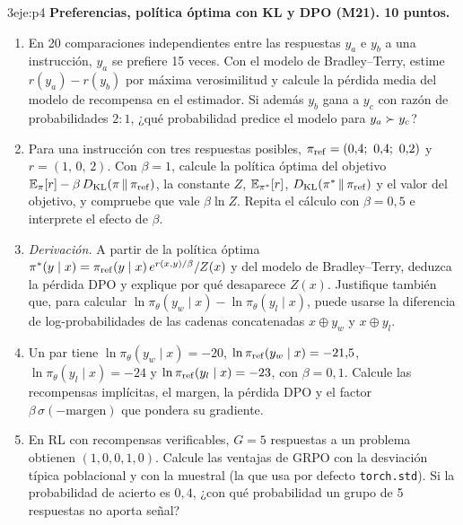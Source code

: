 \begin{ejercicio}{3}{eje:p4}
\textbf{Preferencias, política óptima con KL y DPO (M21). 10 puntos.}
\begin{enumerate}[label=(\alph*)]
  \item {} En 20 comparaciones independientes entre las respuestas $y_a$ e $y_b$ a una instrucción, $y_a$ se prefiere 15 veces. Con el modelo de Bradley--Terry, estime $r(y_a)-r(y_b)$ por máxima verosimilitud y calcule la pérdida media del modelo de recompensa en el estimador. Si además $y_b$ gana a $y_c$ con razón de probabilidades $2{:}1$, ¿qué probabilidad predice el modelo para $y_a\succ y_c$?
  \item {} Para una instrucción con tres respuestas posibles, $\pi_{\mathrm{ref}}=(0{,}4;\ 0{,}4;\ 0{,}2)$ y $r=(1,\,0,\,2)$. Con $\beta=1$, calcule la política óptima del objetivo $\mathbb{E}_\pi[r]-\beta\,D_{\mathrm{KL}}(\pi\,\|\,\pi_{\mathrm{ref}})$, la constante $Z$, $\mathbb{E}_{\pi^{*}}[r]$, $D_{\mathrm{KL}}(\pi^{*}\,\|\,\pi_{\mathrm{ref}})$ y el valor del objetivo, y compruebe que vale $\beta\ln Z$. Repita el cálculo con $\beta=0{,}5$ e interprete el efecto de $\beta$.
  \item {} \emph{Derivación.} A partir de la política óptima $\pi^{*}(y\mid x)=\pi_{\mathrm{ref}}(y\mid x)\,e^{r(x,y)/\beta}/Z(x)$ y del modelo de Bradley--Terry, deduzca la pérdida DPO y explique por qué desaparece $Z(x)$. Justifique también que, para calcular $\ln\pi_\theta(y_w\mid x)-\ln\pi_\theta(y_l\mid x)$, puede usarse la diferencia de log-probabilidades de las cadenas concatenadas $x\oplus y_w$ y $x\oplus y_l$.
  \item {} Un par tiene $\ln\pi_\theta(y_w\mid x)=-20$, $\ln\pi_{\mathrm{ref}}(y_w\mid x)=-21{,}5$, $\ln\pi_\theta(y_l\mid x)=-24$ y $\ln\pi_{\mathrm{ref}}(y_l\mid x)=-23$, con $\beta=0{,}1$. Calcule las recompensas implícitas, el margen, la pérdida DPO y el factor $\beta\,\sigma(-\text{margen})$ que pondera su gradiente.
  \item {} En RL con recompensas verificables, $G=5$ respuestas a un problema obtienen $(1,0,0,1,0)$. Calcule las ventajas de GRPO con la desviación típica poblacional y con la muestral (la que usa por defecto \texttt{torch.std}). Si la probabilidad de acierto es $0{,}4$, ¿con qué probabilidad un grupo de 5 respuestas no aporta señal?
\end{enumerate}
\end{ejercicio}


